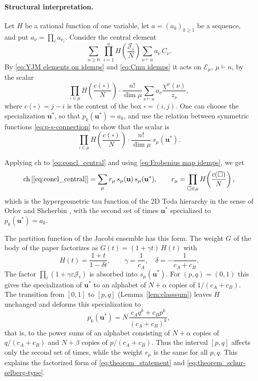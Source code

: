 \documentclass{article}
\theoremstyle{plain}
\theoremstyle{definition}
\numberwithin{equation}{section}
\begin{document}
\paragraph{Structural interpretation.}
Let $H$ be a rational function of one variable, let $a=(a_k)_{k\ge1}$ be a sequence,
and put $a_\nu=\prod_i a_{\nu_i}$. Consider the central element
\begin{equation}
    \label{eq:concl_central}
    \sum_{n\ge0}\ \prod_{i=1}^{n}H\!\left(\frac{\mathcal J_i}{N}\right)
    \sum_{\nu\vdash n}a_\nu\, C_\nu .
\end{equation}
By \eqref{eq:YJM elements on idemps} and \eqref{eq:Cmu idemps} it acts on
$\mathcal E_\mu$, $\mu\vdash n$, by the scalar
\begin{equation}
    \prod_{\square\in\mu}H\!\left(\frac{c(\square)}{N}\right)\cdot
    \frac{n!}{\dim\mu}\sum_{\nu\vdash n}a_\nu\frac{\chi^\mu(\nu)}{z_\nu},
\end{equation}
where $c(\square)=j-i$ is the content of the box $\square=(i,j)$. One can choose the specialization $\mathbf u^*$, so that $p_k(\mathbf u^*) = a_k$, and use the relation between symmetric functions \eqref{eq:p-s-connection} to show that the scalar is
\begin{equation}
    \prod_{\square\in\mu}H\!\left(\frac{c(\square)}{N}\right)\cdot
    \frac{n!}{\dim\mu}\, s_\mu(\mathbf u^*).
\end{equation}

Applying $\mathrm{ch}$ to \eqref{eq:concl_central} and using \eqref{eq:Frobenius map idemps}, we get
\begin{equation}
    \label{eq:concl_hypergeometric}
    \mathrm{ch}\,[\eqref{eq:concl_central}]
    =\sum_{\mu}r_\mu\, s_\mu(\mathbf u)\, s_\mu(\mathbf u^*),
    \qquad r_\mu=\prod_{\square\in\mu}H\!\left(\frac{c(\square)}{N}\right),
\end{equation}
which is the hypergeometric tau function of the 2D Toda hierarchy in the
sense of Orlov and Shcherbin \cite{orlov2001hypergeometric}, with the second set of times $\mathbf u^*$
specialized to $p_k(\mathbf u^*)=a_k$.

The partition function of the Jacobi ensemble has this form. The weight $G$
of the body of the paper factorizes as $G(t)=(1+\gamma t)\,H(t)$ with
\[
H(t)=\frac{1+t}{1-\delta t},\qquad \gamma=\frac1{c_A},\quad \delta=-\frac1{c_A+c_B}.
\]
The factor $\prod_i(1+\gamma\varepsilon\mathcal J_i)$ is absorbed into
$s_\mu(\mathbf u^*)$. For $(p,q)=(0,1)$ this gives the specialization of
$\mathbf u^*$ to an alphabet of $N+\alpha$ copies of $1/(c_A+c_B)$. The
transition from $[0,1]$ to $[p,q]$ (Lemma~\ref{lem:classsum}) leaves $H$
unchanged and deforms this specialization to
\begin{equation}
    \label{eq:concl_specialization}
    p_k(\mathbf u^*)=N\,\frac{c_Aq^k+c_Bp^k}{(c_A+c_B)^k},
\end{equation}
that is, to the power sums of an alphabet consisting of $N+\alpha$ copies of
$q/(c_A+c_B)$ and $N+\beta$ copies of $p/(c_A+c_B)$. Thus the interval
$[p,q]$ affects only the second set of times, while the weight $r_\mu$ is
the same for all $p,q$. This explains the factorized form of
\eqref{eq:theorem_statement} and \eqref{eq:theorem_schur-selberg-type}.
\end{document}
